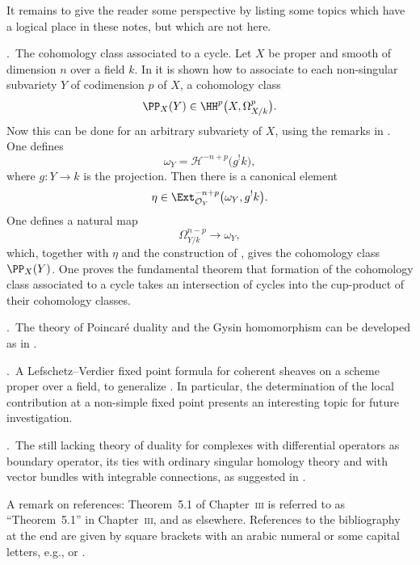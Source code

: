 It remains to give the reader some perspective by listing some topics which have a logical place in these notes, but which are not here.

\medskip
{}.\ The cohomology class associated to a cycle.
Let $X$ be proper and smooth of dimension $n$ over a field $k$. In \cite[\nopp \S4]{8} it is shown how to associate to each non-singular subvariety $Y$ of codimension $p$ of $X$, a cohomology class
\[
\PP_{X}(Y) \in \HH^{p}\bigl(X, \Omega_{X/k}^{p}\bigr).
\]
Now this can be done for an arbitrary subvariety of $X$, using the remarks in \cite{9}. One defines
\[
\omega_{Y} = \mathcal{H}^{-n+p}\bigl(g^{!}k\bigr),
\]
where $g\colon Y\to k$ is the projection. Then there is a canonical element
\[
\eta \in \Ext_{\mathcal{O}_{Y}}^{-n+p}\bigl(\omega_{Y}, g^{!}k\bigr).
\]
One defines a natural map
\[
\Omega_{Y/k}^{n-p} \to \omega_{Y},
\]
which, together with $\eta$ and the construction of \cite[\nopp \S4]{8}, gives the cohomology class $\PP_{X}(Y)$. One proves the fundamental theorem that formation of the cohomology class associated to a cycle takes an intersection of cycles into the cup-product of their cohomology classes.

\medskip
{}.\ The theory of Poincaré duality and the Gysin homomorphism can be developed as in \cite[\nopp \S7]{8}.

\medskip
{}.\ A Lefschetz--Verdier fixed point formula for coherent sheaves on a scheme proper over a field, to generalize \cite[\nopp Thm.~2]{21}. In particular, the determination of the local contribution at a non-simple fixed point presents an interesting topic for future investigation.

\medskip
{}.\ The still lacking theory of duality for complexes with differential operators as boundary operator, its ties with ordinary singular homology theory and with vector bundles with integrable connections, as suggested in \cite{22}.

\bigskip

A remark on references: Theorem~5.1 of Chapter~\textsc{iii} is referred to as ``Theorem~5.1'' in Chapter~\textsc{iii}, and as  elsewhere. References to the bibliography at the end are given by square brackets with an arabic numeral or some capital letters, e.g., \cite[\nopp (31.1)]{14} or \cite[\nopp III,~2.1.12]{EGA}.
\par
\endgroup
